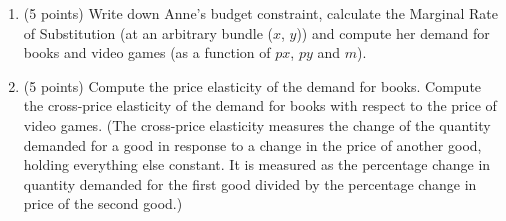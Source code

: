 \documentclass{article}
\begin{document}
\begin{enumerate}
    \item (5 points) Write down Anne’s budget constraint, calculate the Marginal Rate of Substitution (at an arbitrary bundle ($x$, $y$)) and compute her demand for books and video games (as a function of $px$, $py$ and $m$).
    \item (5 points) Compute the price elasticity of the demand for books. Compute the cross-price elasticity of the demand for books with respect to the price of video games. (The cross-price elasticity measures the change of the quantity demanded for a good in response to a change in the price of another good, holding everything else constant. It is measured as the percentage change in quantity demanded for the ﬁrst good divided by the percentage change in price of the second good.)
    
\end{enumerate}

\end{document}

